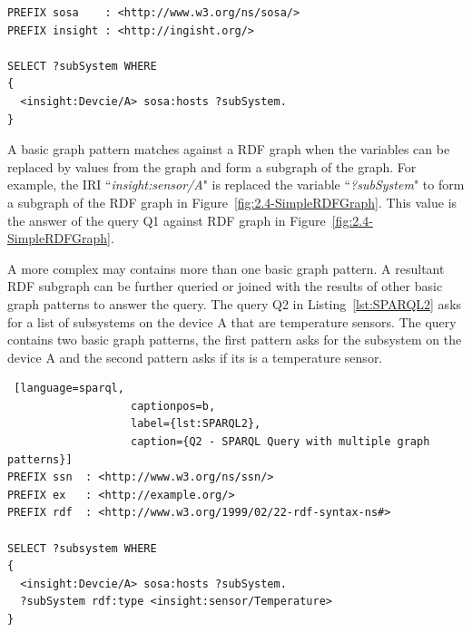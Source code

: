 {\vspace{5mm}
\begin{lstlisting}[language=sparql,
  				   captionpos=b,
                   label={lst:SPARQL1},
                   caption={Q1 - SPARQL Query with a graph pattern}]  
PREFIX sosa    : <http://www.w3.org/ns/sosa/>
PREFIX insight : <http://ingisht.org/>

SELECT ?subSystem WHERE
{ 
  <insight:Devcie/A> sosa:hosts ?subSystem.
}    		
\end{lstlisting}


A basic graph pattern matches against a RDF graph when the variables can be replaced by values from the graph and form a subgraph of the graph.
For example, the IRI ``\textit{insight:sensor/A}" is replaced the variable ``\textit{?subSystem}" to form a subgraph of the RDF graph in Figure~\ref{fig:2.4-SimpleRDFGraph}.
This value is the answer of the query Q1 against RDF graph in Figure~\ref{fig:2.4-SimpleRDFGraph}.

A more complex may contains more than one basic graph pattern.
A resultant RDF subgraph can be further queried or joined with the results of other basic graph patterns to answer the query.
The query Q2 in Listing~\ref{lst:SPARQL2} asks for a list of subsystems on the device A that are temperature sensors.
The query contains two basic graph patterns, the first pattern asks for the subsystem on the device A and the second pattern asks if its is a temperature sensor.

\vspace{5mm}
\begin{lstlisting} [language=sparql,
  				   captionpos=b,
                   label={lst:SPARQL2},
                   caption={Q2 - SPARQL Query with multiple graph patterns}]                    
PREFIX ssn  : <http://www.w3.org/ns/ssn/>
PREFIX ex   : <http://example.org/>
PREFIX rdf  : <http://www.w3.org/1999/02/22-rdf-syntax-ns#>

SELECT ?subsystem WHERE
{ 
  <insight:Devcie/A> sosa:hosts ?subSystem.
  ?subSystem rdf:type <insight:sensor/Temperature>
}    		
\end{lstlisting}

}

